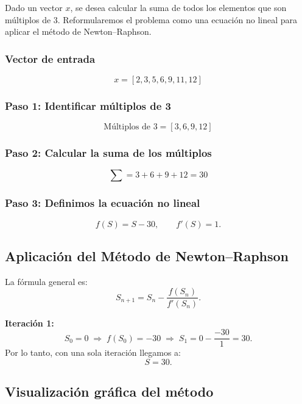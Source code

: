 \documentclass[12pt]{article}
\begin{document}
Dado un vector \( x \), se desea calcular la suma de todos los elementos que son múltiplos de 3. Reformularemos el problema como una ecuación no lineal para aplicar el método de Newton–Raphson.

\subsubsection*{Vector de entrada}
\[
x = [2, 3, 5, 6, 9, 11, 12]
\]

\subsubsection*{Paso 1: Identificar múltiplos de 3}
\[
\text{Múltiplos de 3} = [3, 6, 9, 12]
\]

\subsubsection*{Paso 2: Calcular la suma de los múltiplos}
\[
\sum = 3 + 6 + 9 + 12 = 30
\]

\subsubsection*{Paso 3: Definimos la ecuación no lineal}
\[
f(S) = S - 30, 
\qquad
f'(S) = 1.
\]

\subsection*{Aplicación del Método de Newton–Raphson}

La fórmula general es:
\[
S_{n+1} = S_n - \frac{f(S_n)}{f'(S_n)}.
\]

\textbf{Iteración 1:}
\[
S_0 = 0 \;\Rightarrow\; f(S_0) = -30
\;\Rightarrow\;
S_1 = 0 - \frac{-30}{1} = 30.
\]
Por lo tanto, con una sola iteración llegamos a:
\[
S = 30.
\]

\subsection*{Visualización gráfica del método}
\end{document}
